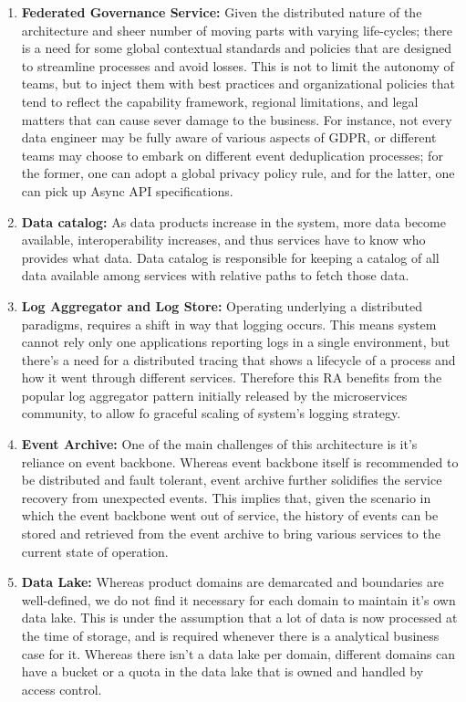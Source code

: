 \documentclass[runningheads]{llncs}
\begin{document}
\begin{enumerate}
    \item \textbf{Federated Governance Service:} Given the distributed nature of the architecture and sheer number of moving parts with varying life-cycles; there is a need for some global contextual standards and policies that are designed to streamline processes and avoid losses. This is not to limit the autonomy of teams, but to inject them with best practices and organizational policies that tend to reflect the capability framework, regional limitations, and legal matters that can cause sever damage to the business. For instance, not every data engineer may be fully aware of various aspects of GDPR, or different teams may choose to embark on different event deduplication processes; for the former, one can adopt a global privacy policy rule, and for the latter, one can pick up Async API specifications. 
    \item \textbf{Data catalog:} As data products increase in the system, more data become available, interoperability increases, and thus services have to know who provides what data. Data catalog is responsible for keeping a catalog of all data available among services with relative paths to fetch those data. 
    \item \textbf{Log Aggregator and Log Store:} Operating underlying a distributed paradigms, requires a shift in way that logging occurs. This means system cannot rely only one applications reporting logs in a single environment, but there's a need for a distributed tracing that shows a lifecycle of a process and how it went through different services. Therefore this RA benefits from the popular log aggregator pattern initially released by the microservices community, to allow fo graceful scaling of system's logging strategy. 
    \item \textbf{Event Archive:} One of the main challenges of this architecture is it's reliance on event backbone. Whereas event backbone itself is recommended to be distributed and fault tolerant, event archive further solidifies the service recovery from unexpected events. This implies that, given the scenario in which the event backbone went out of service, the history of events can be stored and retrieved from the event archive to bring various services to the current state of operation. 
    \item \textbf{Data Lake:} Whereas product domains are demarcated and boundaries are well-defined, we do not find it necessary for each domain to maintain it's own data lake. This is under the assumption that a lot of data is now processed at the time of storage, and is required whenever there is a analytical business case for it. Whereas there isn't a data lake per domain, different domains can have a bucket or a quota in the data lake that is owned and handled by access control. 

\end{enumerate}
\end{document}

